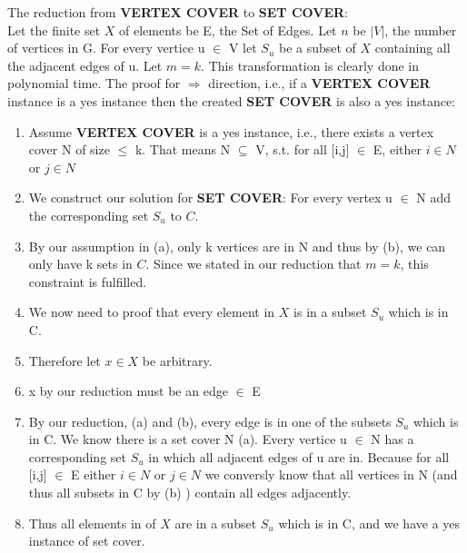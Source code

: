 \documentclass [11pt]{article}
\newcommand{\solution}[1]{\noindent {\bf Solution.}  #1}
\begin{document}
\solution{The reduction from \textbf{VERTEX COVER} to \textbf{SET COVER}:\\
  Let the finite set $X$ of elements be E, the Set of Edges. Let $n$ be $|V|$, the number of vertices in G. For every vertice u $\in$ V let $S_u$ be a subset of $X$ containing all the adjacent edges of u. Let $m=k$.
  This transformation is clearly done in polynomial time.
  The proof for $\Rightarrow$ direction, i.e., if a \textbf{VERTEX COVER} instance is a yes instance then the created \textbf{SET COVER} is also a yes instance:
  \begin {enumerate}
  \item{Assume \textbf{VERTEX COVER} is a yes instance, i.e., there exists a vertex cover N of size $\leq$ k. That means N $\subseteq$ V, s.t. for all [i,j] $\in$ E, either $i \in N$ or $j \in N$ }
  \item{We construct our solution for \textbf{SET COVER}: For every vertex u $\in$ N add the corresponding set $S_u$ to $C$.}
  \item{By our assumption in (a), only k vertices are in N and thus by (b), we can only have k sets in $C$. Since we stated in our reduction that $m=k$, this constraint is fulfilled.}
  \item{We now need to proof that every element in $X$ is in a subset $S_u$ which is in C.} 
  \item{Therefore let $x \in X$ be arbitrary.}
  \item{x by our reduction must be an edge $\in$ E}
  \item{By our reduction, (a) and (b), every edge is in one of the subsets $S_u$ which is in C. We know there is a set cover N (a). Every vertice u $\in$ N has a corresponding set $S_u$ in which all
    adjacent edges of u are in. Because for all [i,j] $\in$ E either $i \in N$ or $j \in N $ we conversly know that all vertices in N (and thus all subsets in C by (b) ) contain all edges adjacently.}
  \item{Thus all elements in of $X$ are in a subset $S_u$ which is in C, and we have a yes instance of set cover.}  
  \end {enumerate}
}
\end{document}
